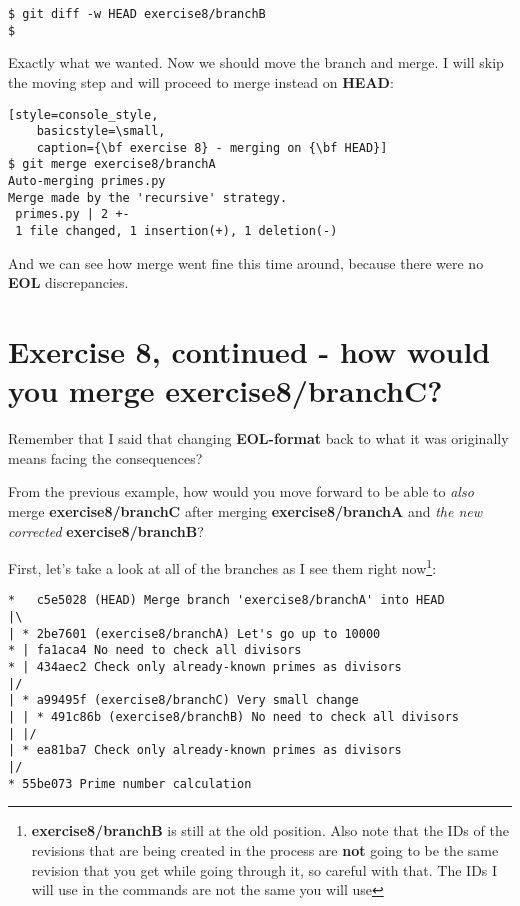 \begin{lstlisting}[style=console_style,
	basicstyle=\small,
	caption={\bf exercise 8} - comparing results]
$ git diff -w HEAD exercise8/branchB
$
\end{lstlisting}

Exactly what we wanted. Now we should move the branch and merge. I will skip the moving step and will proceed to merge instead on
{\bf HEAD}:

\begin{lstlisting}[style=console_style,
	basicstyle=\small,
	caption={\bf exercise 8} - merging on {\bf HEAD}]
$ git merge exercise8/branchA
Auto-merging primes.py
Merge made by the 'recursive' strategy.
 primes.py | 2 +-
 1 file changed, 1 insertion(+), 1 deletion(-)
\end{lstlisting}

And we can see how merge went fine this time around, because there were no {\bf EOL} discrepancies.

\section{Exercise 8, continued - how would you merge exercise8/branchC?}
\label{exercise08_cont}

Remember that I said that changing {\bf EOL-format} back to what it was originally means facing the consequences?

From the previous example, how would you move forward to be able to {\it also} merge {\bf exercise8/branchC} after merging
{\bf exercise8/branchA} and {\it the new corrected} {\bf exercise8/branchB}?

First, let's take a look at all of the branches as I see them right now\footnote{{\bf exercise8/branchB} is still at the old
position. Also note that the IDs of the revisions that are being created in the process are {\bf not} going to be the same
revision that you get while going through it, so careful with that. The IDs I will use in the commands are not the same you
will use}:

\begin{lstlisting}[style=console_style,
	basicstyle=\small,
	caption={\bf exercise 8, continued} - current history of branches]
*   c5e5028 (HEAD) Merge branch 'exercise8/branchA' into HEAD
|\  
| * 2be7601 (exercise8/branchA) Let's go up to 10000
* | fa1aca4 No need to check all divisors
* | 434aec2 Check only already-known primes as divisors
|/  
| * a99495f (exercise8/branchC) Very small change
| | * 491c86b (exercise8/branchB) No need to check all divisors
| |/  
| * ea81ba7 Check only already-known primes as divisors
|/  
* 55be073 Prime number calculation
\end{lstlisting}

